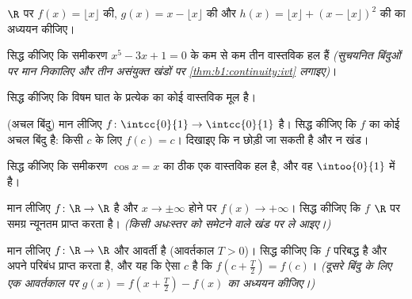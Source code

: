 \begin{exercise}[$\star$]\label{exo:b1:continuity:2}
$\R$ पर $f(x) = \lfloor x \rfloor$ की, $g(x) = x - \lfloor x \rfloor$ की और
$h(x) = \lfloor x \rfloor + (x - \lfloor x\rfloor)^2$ की  का अध्ययन
कीजिए।
\end{exercise}

\begin{exercise}[$\star$]\label{exo:b1:continuity:3}
सिद्ध कीजिए कि समीकरण $x^5 - 3x + 1 = 0$ के कम से कम तीन वास्तविक हल हैं
\emph{(सुचयनित बिंदुओं पर मान निकालिए और तीन असंयुक्त खंडों पर
\cref{thm:b1:continuity:ivt} लगाइए)}।
\end{exercise}

\begin{exercise}[$\star$]\label{exo:b1:continuity:4}
सिद्ध कीजिए कि विषम घात के प्रत्येक  का कोई वास्तविक मूल है।
\end{exercise}

\begin{exercise}[$\star\star$]\label{exo:b1:continuity:5}
(अचल बिंदु) मान लीजिए $f \colon \intcc{0}{1} \to \intcc{0}{1}$  है।
सिद्ध कीजिए कि $f$ का कोई अचल बिंदु है: किसी $c$ के लिए $f(c) = c$। दिखाइए
कि न  छोड़ी जा सकती है और न खंड।
\end{exercise}

\begin{exercise}[$\star\star$]\label{exo:b1:continuity:6}
सिद्ध कीजिए कि समीकरण $\cos x = x$ का ठीक एक वास्तविक हल है, और वह
$\intoo{0}{1}$ में है।
\end{exercise}

\begin{exercise}[$\star\star$]\label{exo:b1:continuity:7}
मान लीजिए $f \colon \R \to \R$  है और $x \to \pm\infty$ होने पर $f(x)
\to +\infty$। सिद्ध कीजिए कि $f$ $\R$ पर समग्र न्यूनतम प्राप्त करता है।
\emph{(किसी अधःस्तर  को समेटने वाले खंड पर ले आइए।)}
\end{exercise}

\begin{exercise}[$\star\star$]\label{exo:b1:continuity:8}
मान लीजिए $f \colon \R \to \R$  और आवर्ती है (आवर्तकाल $T > 0$)। सिद्ध
कीजिए कि $f$ परिबद्ध है और अपने परिबंध प्राप्त करता है, और यह कि ऐसा $c$ है
कि $f(c + \frac T2) = f(c)$। \emph{(दूसरे बिंदु के लिए एक आवर्तकाल पर $g(x)
= f(x + \frac T2) - f(x)$ का अध्ययन कीजिए।)}
\end{exercise}


